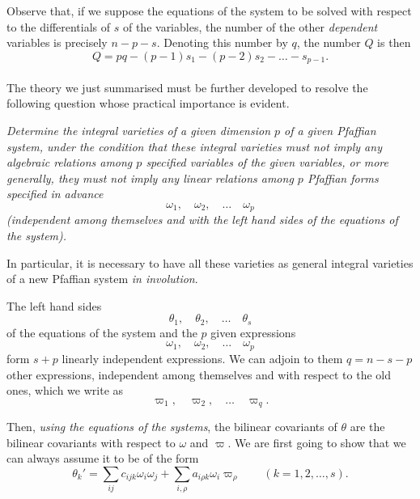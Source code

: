 \documentclass[leqno,11pt]{book}
\theoremstyle{shape1}
\theoremstyle{shapesmall}
\newcommand{\vp}{\varpi}
\newcommand{\somespace}{\vspace{9pt}}
\begin{document}
Observe that, if we suppose the equations of the system to be solved with respect to the differentials of $s$ of the variables, the number of the other \emph{dependent} variables is precisely $n-p-s$. Denoting this number by $q$, the number $Q$ is then
\begin{equation}
  \label{eq:p9}
  Q=pq-(p-1)s_{1}-(p-2)s_{2}-\dots-s_{p-1}.
\end{equation}

\paragraph{}
\label{sec:p4}
The theory we just summarised must be further developed to resolve the following question whose practical importance is evident.

\somespace

\emph{Determine the integral varieties of a given dimension $p$ of a given Pfaffian system, under the condition that these integral varieties must not imply any algebraic relations among $p$ specified variables of the given variables, or more generally, they must not imply any linear relations among $p$ Pfaffian forms specified in advance}
\[
\omega_{1},\quad\omega_{2},\quad\dots\quad\omega_{p}
\]
\emph{(independent among themselves and with the left hand sides of the equations of the system).}

\somespace

In particular, it is necessary to have all these varieties as general integral varieties of a new Pfaffian system \emph{in involution}.

The left hand sides
\[
\theta_{1},\quad\theta_{2},\quad\dots\quad\theta_{s}
\]
of the equations of the system and the $p$ given expressions
\[
\omega_{1},\quad\omega_{2},\quad\dots\quad\omega_{p}
\]
form $s+p$ linearly independent expressions. We can adjoin to them $q=n-s-p$ other expressions, independent among themselves and with respect to the old ones, which we write as
\[
\vp_{1},\quad\vp_{2},\quad\dots\quad\vp_{q}.
\]

Then, \emph{using the equations of the systems}, the bilinear covariants of $\theta$ are the bilinear covariants with respect to $\omega$ and $\vp$. We are first going to show that we can always assume it to be of the form
\begin{equation}
  \label{eq:p10}
  \theta_{k}'=\sum_{ij}c_{ijk}\omega_{i}\omega_{j}+\sum_{i,\rho}a_{i\rho k}\omega_{i}\vp_{\rho}\qquad(k=1,2,\dots,s).
\end{equation}
\end{document}
